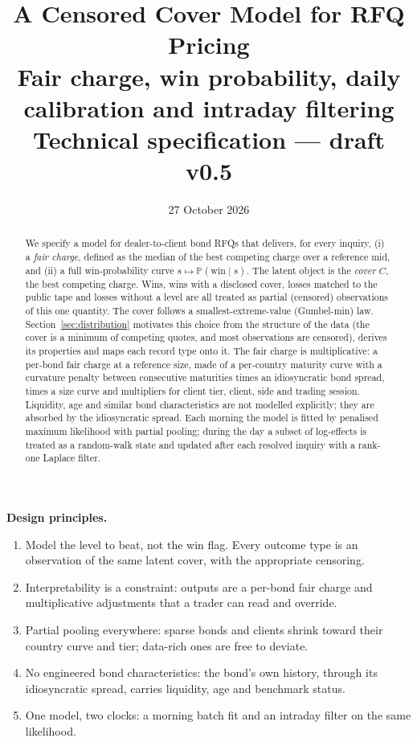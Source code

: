 \documentclass[11pt,a4paper]{article}
\title{A Censored Cover Model for RFQ Pricing\\[3pt]
\large Fair charge, win probability, daily calibration and intraday filtering\\[2pt]
\normalsize Technical specification --- draft v0.5}
\author{}
\date{27 October 2026}
\theoremstyle{definition}
\theoremstyle{remark}
\newcommand{\Prob}{\mathbb{P}}
\begin{document}
\maketitle

\begin{abstract}
We specify a model for dealer-to-client bond RFQs that delivers, for every inquiry, (i) a \emph{fair charge}, defined as the median of the best competing charge over a reference mid, and (ii) a full win-probability curve $s\mapsto\Prob(\text{win}\mid s)$. The latent object is the \emph{cover} $C$, the best competing charge. Wins, wins with a disclosed cover, losses matched to the public tape and losses without a level are all treated as partial (censored) observations of this one quantity. The cover follows a smallest-extreme-value (Gumbel-min) law. Section~\ref{sec:distribution} motivates this choice from the structure of the data (the cover is a minimum of competing quotes, and most observations are censored), derives its properties and maps each record type onto it. The fair charge is multiplicative: a per-bond fair charge at a reference size, made of a per-country maturity curve with a curvature penalty between consecutive maturities times an idiosyncratic bond spread, times a size curve and multipliers for client tier, client, side and trading session. Liquidity, age and similar bond characteristics are not modelled explicitly; they are absorbed by the idiosyncratic spread. Each morning the model is fitted by penalised maximum likelihood with partial pooling; during the day a subset of log-effects is treated as a random-walk state and updated after each resolved inquiry with a rank-one Laplace filter.
\end{abstract}

\begin{principle}
\textbf{Design principles.}
\begin{enumerate}[leftmargin=*,itemsep=1pt]
\item Model the level to beat, not the win flag. Every outcome type is an observation of the same latent cover, with the appropriate censoring.
\item Interpretability is a constraint: outputs are a per-bond fair charge and multiplicative adjustments that a trader can read and override.
\item Partial pooling everywhere: sparse bonds and clients shrink toward their country curve and tier; data-rich ones are free to deviate.
\item No engineered bond characteristics: the bond's own history, through its idiosyncratic spread, carries liquidity, age and benchmark status.
\item One model, two clocks: a morning batch fit and an intraday filter on the same likelihood.
\end{enumerate}
\end{principle}
\end{document}
